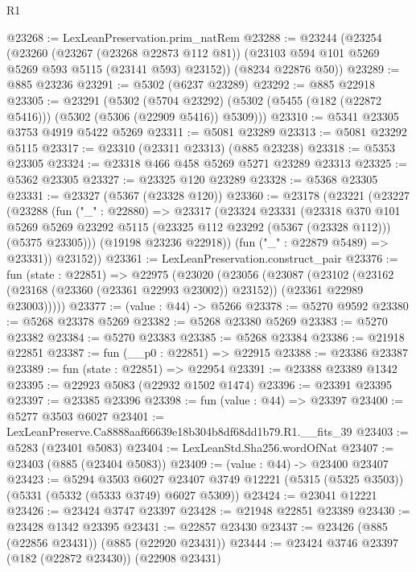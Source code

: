 \begin{lexlean}{R1}
\begin{coremodule}
@23268 := LexLeanPreservation.prim_natRem
@23288 := @23244
    (@23254
      (@23260
        (@23267 (@23268 @22873 @112 @81))
        (@23103 @594 @101 @5269 @5269 @593 @5115 (@23141 @593) @23152))
      (@8234 @22876 @50))
@23289 := @885 @23236
@23291 := @5302 (@6237 @23289)
@23292 := @885 @22918
@23305 := @23291
    (@5302
      (@5704 @23292)
      (@5302 (@5455 (@182 (@22872 @5416))) (@5302 (@5306 (@22909 @5416)) @5309)))
@23310 := @5341 @23305 @3753 @4919 @5422 @5269
@23311 := @5081 @23289
@23313 := @5081 @23292 @5115
@23317 := @23310 (@23311 @23313) (@885 @23238)
@23318 := @5353 @23305
@23324 := @23318 @466 @458 @5269 @5271 @23289 @23313
@23325 := @5362 @23305
@23327 := @23325 @120 @23289
@23328 := @5368 @23305
@23331 := @23327 (@5367 (@23328 @120))
@23360 := @23178
    (@23221
      (@23227
        (@23288
          (fun ("_" : @22880) =>
          @23317
            (@23324
              @23331
              (@23318
                @370
                @101
                @5269
                @5269
                @23292
                @5115
                (@23325 @112 @23292 (@5367 (@23328 @112)))
                (@5375 @23305)))
            (@19198 @23236 @22918))
          (fun ("_" : @22879 @5489) => @23331))
        @23152))
@23361 := LexLeanPreservation.construct_pair
@23376 := fun (state : @22851) =>
  @22975
    (@23020
      (@23056
        (@23087
          (@23102
            (@23162 (@23168 (@23360 (@23361 @22993 @23002)) @23152))
            (@23361 @22989 @23003)))))
@23377 := (value : @44) -> @5266
@23378 := @5270 @9592
@23380 := @5268 @23378 @5269
@23382 := @5268 @23380 @5269
@23383 := @5270 @23382
@23384 := @5270 @23383
@23385 := @5268 @23384
@23386 := @21918 @22851
@23387 := fun (__p0 : @22851) => @22915
@23388 := @23386 @23387
@23389 := fun (state : @22851) => @22954
@23391 := @23388 @23389 @1342
@23395 := @22923 @5083 (@22932 @1502 @1474)
@23396 := @23391 @23395
@23397 := @23385 @23396
@23398 := fun (value : @44) => @23397
@23400 := @5277 @3503 @6027
@23401 := LexLeanPreserve.Ca8888aaf66639e18b304b8df68dd1b79.R1.__fits_39
@23403 := @5283 (@23401 @5083)
@23404 := LexLeanStd.Sha256.wordOfNat
@23407 := @23403 (@885 (@23404 @5083))
@23409 := (value : @44) -> @23400 @23407
@23423 := @5294
    @3503
    @6027
    @23407
    @3749
    @12221
    (@5315 (@5325 @3503))
    (@5331 (@5332 (@5333 @3749) @6027 @5309))
@23424 := @23041 @12221
@23426 := @23424 @3747 @23397
@23428 := @21948 @22851 @23389
@23430 := @23428 @1342 @23395
@23431 := @22857 @23430
@23437 := @23426 (@885 (@22856 @23431)) (@885 (@22920 @23431))
@23444 := @23424 @3746 @23397 (@182 (@22872 @23430)) (@22908 @23431)

\end{coremodule}
\end{lexlean}

